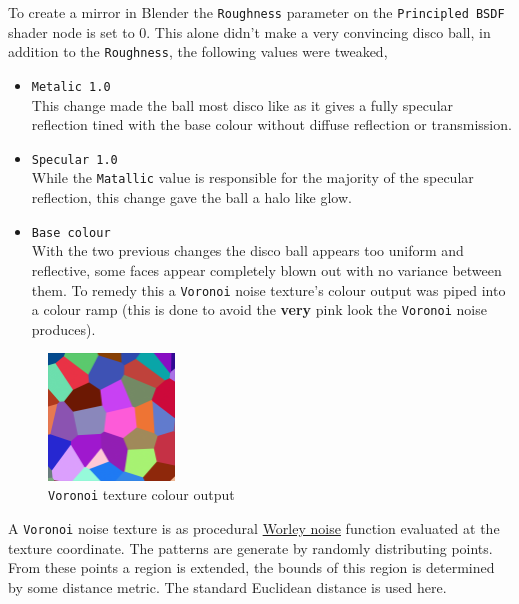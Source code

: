\documentclass[11pt]{article}
\begin{document}
To create a mirror in Blender the \texttt{Roughness} parameter on the \texttt{Principled BSDF}
shader node is set to 0. This alone didn't make a very convincing disco ball, in
addition to the \texttt{Roughness}, the following values were tweaked,
\begin{itemize}
\item \texttt{Metalic 1.0}\\
This change made the ball most disco like as it gives a fully specular
reflection tined with the base colour without diffuse reflection or
transmission.
\item \texttt{Specular 1.0}\\
While the \texttt{Matallic} value is responsible for the majority of the specular
reflection, this change gave the ball a halo like glow.
\item \texttt{Base colour}\\
With the two previous changes the disco ball appears too uniform and reflective, some
faces appear completely blown out with no variance between them. To remedy
this a \texttt{Voronoi} noise texture's colour output was piped into a colour ramp
(this is done to avoid the \textbf{very} pink look  the \texttt{Voronoi} noise produces).
\end{itemize}

\begin{figure}[htbp]
\centering
\includegraphics[width=0.3\textwidth]{Images/render_shader-nodes_textures_voronoi_smoothness-color-zero.png}
\caption{\texttt{Voronoi} texture colour output}
\end{figure}
A \texttt{Voronoi} noise texture is as procedural \href{https://en.wikipedia.org/wiki/Worley\_noise}{Worley noise} function evaluated at the texture
coordinate. The patterns are generate by randomly distributing points. From
these points a region is extended, the bounds of this region is determined by
some distance metric. The standard Euclidean distance is used here.
\end{document}
